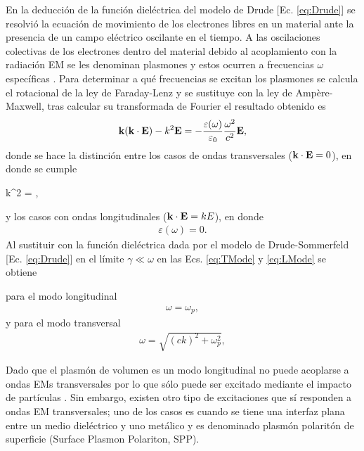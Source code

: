En la deducción de la función dieléctrica del modelo de Drude [Ec. \eqref{eq:Drude}] se resolvió la ecuación de movimiento de los electrones libres en un material ante la  presencia de un campo eléctrico oscilante en el tiempo. A las oscilaciones colectivas  de los electrones dentro del material debido al acoplamiento con la radiación EM se les denominan  plasmones y estos ocurren a  frecuencias $\omega$ específicas \cite{stockman2011nanoplasmonics}. Para determinar a qué frecuencias se excitan los plasmones se calcula el rotacional de la ley de Faraday-Lenz y se sustituye con la ley de Ampère-Maxwell, tras calcular su transformada de Fourier el resultado obtenido es \cite{maier2007plasmonics}
	\begin{align*}
	\vb{k}(\vb{k}\cdot\vb{E})-k^2\vb{E} =
			 -\frac{\varepsilon(\omega)}{\varepsilon_0}
			 \frac{\omega^2}{c^2}\vb{E},
	\end{align*}
donde se hace la distinción entre los casos de ondas transversales ($\vb{k}\cdot\vb{E}=0$), en donde se cumple\vspace*{-.5em}
	\begin{tcolorbox}[title = Relación de dispersión genérica, ams align, breakable ]
	k^2 =   ,
	\label{eq:TMode}
	\end{tcolorbox}\vspace*{-.5em}\noindent
y los casos con ondas longitudinales ($\vb{k}\cdot\vb{E}=kE$), en donde
	\begin{align}
	\varepsilon(\omega) = 0.
	\label{eq:LMode}
	\end{align}
Al sustituir con la función dieléctrica dada por el modelo de Drude-Sommerfeld [Ec. \eqref{eq:Drude}] en el límite $\gamma\ll\omega$ en las Ecs. \eqref{eq:TMode} y \eqref{eq:LMode} se obtiene \vspace*{-.5em}
	\begin{tcolorbox}[title = Relación de dispersión del plasmón de volumen,  breakable ]
para el modo longitudinal 
	\begin{align}
	\omega=\omega_p,
	\end{align}
y para el modo transversal 
	\begin{align}
		\omega =  \sqrt{(ck)^2+\omega_p^2},
	\label{eq:volumePlasmon}
	\end{align}
	\end{tcolorbox}\vspace*{-.5em}\noindent
Dado que el plasmón de volumen es un modo longitudinal no puede acoplarse a ondas EMs transversales por lo que sólo puede ser excitado mediante el impacto de partículas \cite{maier2007plasmonics}. Sin embargo, existen otro tipo de excitaciones que sí responden a ondas EM transversales; uno de los casos es cuando se tiene una interfaz plana entre un medio dieléctrico y uno metálico y es denominado plasmón polaritón de superficie (Surface Plasmon Polariton, SPP).
	

